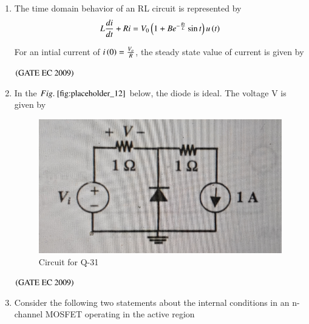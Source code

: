 \documentclass[journal,12pt,onecolumn]{IEEEtran}
\theoremstyle{remark}
\begin{document}
\begin{enumerate}[start=1, label={Q\arabic*.}]
\item The time domain behavior of an RL circuit is represented by 
\begin{align*} 
 L\frac{di}{dt} + Ri = V_0 \left(1+ Be^{-\frac{Rt}{L}} \sin t \right) u\left(t\right)
\end{align*}

For an intial current of $i\left(0\right) = \frac{V_o}{R}$, the steady state value of current is given by 

\begin{enumerate}
\end{enumerate}
\hfill $\left(\text{GATE EC 2009}\right)$

\item In the $\figref{fig:placeholder_12}$ below, the diode is ideal. The voltage V is given by
\begin{figure}[H]
    \centering
    \includegraphics[width=0.5\columnwidth]{figs/img_12.jpg}
    \caption{\centering Circuit for Q-31}
    \label{fig:placeholder_12}
\end{figure}
\begin{enumerate}
\end{enumerate}
\hfill $\left(\text{GATE EC 2009}\right)$

\item Consider the following two statements about the internal conditions in an n-channel MOSFET operating in the active region 
\begin{align*}
    

\end{align*}
\end{enumerate}
\end{document}
